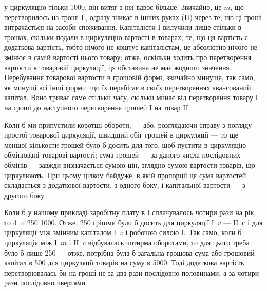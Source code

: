 \parcont{}  %
у циркуляцію тільки 1000, він витяг з неї вдвоє більше. Звичайно,
це $m$, що перетворилось на гроші $Г$, одразу зникає в інших руках
(II) через те, що ці гроші витрачається на засоби споживання. Капіталісти I
вилучили лише стільки в грошах, скільки подали в циркуляцію вартості
в товарах; те, що ця вартість є додаткова вартість, тобто нічого не коштує
капіталістам, це абсолютно нічого не змінює в самій вартості цього товару;
отже, оскільки ходить про перетворення вартости в товаровій циркуляції,
ця обставина не має жодного значення. Перебування товарової вартости
в грошовій формі, звичайно минуще, так само, як минущі всі інші форми,
що їх перебігає в своїх перетвореннях авансований капітал. Воно триває
саме стільки часу, скільки минає від перетворення товару I на гроші до
наступного перетворення грошей I на товар II.

Коли б ми припустили коротші обороти, — або, розглядаючи справу
з погляду простої товарової циркуляції, швидший обіг грошей в циркуляції
— то ще меншої кількости грошей було б досить для того, щоб
пустити в циркуляцію обмінювані товарові вартості; сума грошей — за
даного числа послідовних обмінів — завжди визначається сумою цін, зглядно
сумою вартости товарів, що циркулюють. При цьому цілком байдуже,
в якій пропорції ця сума вартостей складається з додаткової вартости,
з одного боку, і капітальної вартости — з другого боку.

Коли б у нашому прикладі заробітну плату в І сплачувалось чотири
рази на рік, то 4 × 250 \deq{} 1000. Отже, 250 грішми було б
досить для циркуляції І~$v$ —  II~$с$ і для циркуляції між змінним капіталом
І~$v$ і робочою силою І.~Так само, коли б циркуляція між І~$m$ і
II~$c$ відбувалась чотирма оборотами, то для цього треба було б лише
250 — отже, потрібна була б загальна грошова сума або грошовий
капітал в 500 для циркуляції товарів на суму в 5000.
Тоді додаткова вартість перетворювалась би на гроші не за два рази
послідовно половинами, а за чотири рази послідовно чвертями.

